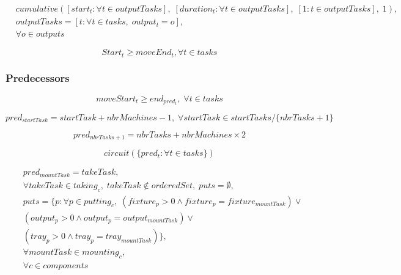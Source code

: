 \documentclass[10pt,a4paper]{report}
\begin{document}
\begin{align*}
&cumulative([start_{t} : \forall t \in outputTasks], \; [duration_t : \forall t \in outputTasks], \; [1 : t \in outputTasks], \; 1),\\
&outputTasks = [t : \forall t \in tasks, \; output_t = o],\\
&\forall o \in outputs
\end{align*}

$$Start_t \geq moveEnd_t, \forall t \in tasks$$

\subsubsection*{Predecessors}

$$moveStart_t \geq end_{pred_t}, \; \forall t \in tasks$$

$$pred_{startTask} = startTask + nbrMachines - 1, \; \forall startTask \in startTasks / \{nbrTasks + 1\}$$

$$pred_{nbrTasks + 1} = nbrTasks + nbrMachines \times 2$$

$$circuit(\{pred_t : \forall t \in tasks\})$$

\begin{align*}
&pred_{mountTask} = takeTask,\\
&\forall takeTask \in taking_c, \; takeTask \notin orderedSet, \; puts = \emptyset,\\
&puts = \{p : \forall p \in putting_c, \; (fixture_p > 0 \land fixture_p = fixture_{mountTask}) \lor \\
&(output_p > 0 \land output_p = output_{mountTask}) \lor \\
&(tray_p > 0 \land tray_p = tray_{mountTask})\},\\
&\forall mountTask \in mounting_c,\\
&\forall c \in components
\end{align*}
\end{document}
